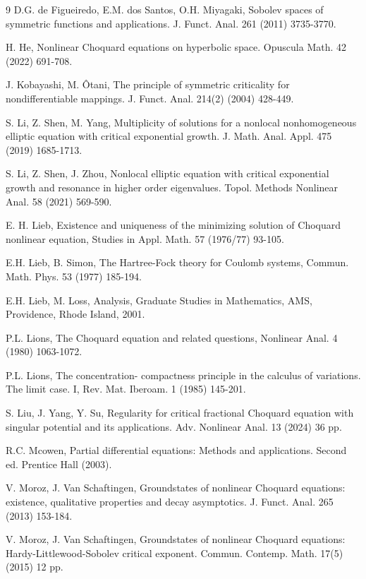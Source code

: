\documentclass[11pt]{amsart}
\numberwithin{equation}{section}
\newcommand{\1}{\frac{1}{2}}
\begin{document}
\begin{thebibliography}{9}
		 D.G. de Figueiredo, E.M. dos Santos, O.H. Miyagaki, Sobolev spaces of symmetric functions and applications. J. Funct. Anal. 261 (2011) 3735-3770.
		
		 H. He, Nonlinear Choquard equations on hyperbolic space. Opuscula Math. 42 (2022) 691-708.
		
		 J. Kobayashi, M. \^Otani, The principle of symmetric criticality for nondifferentiable
		mappings. J. Funct. Anal. 214(2) (2004) 428-449.
		
		 S. Li, Z. Shen, M. Yang, Multiplicity of solutions for a nonlocal nonhomogeneous elliptic equation with critical exponential growth. J. Math. Anal. Appl. 475 (2019) 1685-1713.
		
		 S. Li, Z. Shen, J. Zhou, Nonlocal elliptic equation with critical exponential growth and resonance in higher order eigenvalues. Topol. Methods Nonlinear Anal. 58 (2021) 569-590.
		
		 E. H. Lieb, Existence and uniqueness of the minimizing solution of Choquard nonlinear equation, Studies in Appl. Math. 57 (1976/77) 93-105.
		
		 E.H. Lieb, B. Simon, The Hartree-Fock theory for Coulomb systems, Commun. Math. Phys. 53 (1977) 185-194.
		
		 E.H. Lieb, M. Loss, Analysis, Graduate Studies in Mathematics, AMS, Providence, Rhode Island, 2001.
		
		 P.L. Lions, The Choquard equation and related questions, Nonlinear Anal. 4 (1980) 1063-1072.
		
		 P.L. Lions, The concentration- 
		compactness principle in the calculus of variations. The limit case. I, Rev. Mat. Iberoam. 1 (1985) 145-201.
		
		 S. Liu, J. Yang, Y. Su, Regularity for critical fractional Choquard equation with singular potential and its applications. Adv. Nonlinear Anal. 13 (2024) 36 pp.
		
		 R.C. Mcowen, Partial differential equations: Methods and applications. Second ed. Prentice Hall (2003).
		
		 V. Moroz, J. Van Schaftingen, Groundstates of nonlinear Choquard equations: existence, qualitative properties and decay asymptotics. J. Funct. Anal. 265 (2013) 153-184.
		
		 V. Moroz, J. Van Schaftingen, Groundstates of nonlinear Choquard equations: Hardy-Littlewood-Sobolev critical exponent. Commun. Contemp. Math. 17(5) (2015) 12 pp.
		

\end{thebibliography}
\end{document}
